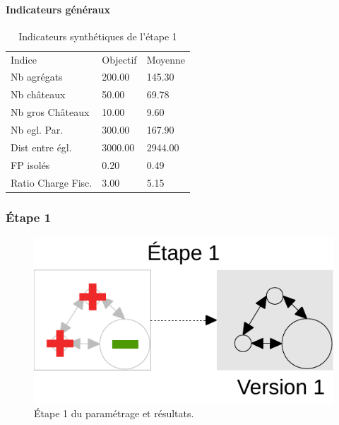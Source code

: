 \documentclass[12pt, a4paper, oneside]{book}
\begin{document}
	\paragraph{Indicateurs généraux}
	
	\begin{table}[H]
		\centering
		\caption{Indicateurs synthétiques de l'étape 1}
		\label{my-label}
		\begin{tabular}{lll}
			Indice             & Objectif & Moyenne \\
			Nb agrégats        & 200.00   & 145.30  \\
			Nb châteaux        & 50.00    & 69.78   \\
			Nb gros  Châteaux  & 10.00    & 9.60    \\
			Nb egl. Par.       & 300.00   & 167.90  \\
			Dist entre égl.    & 3000.00  & 2944.00 \\
			FP isolés          & 0.20     & 0.49    \\
			Ratio Charge Fisc. & 3.00     & 5.15   
		\end{tabular}
	\end{table}

\pagebreak
	\subsubsection{Étape 1}
		\begin{figure}[H]
			\centering
			\includegraphics[width = \linewidth, page = 1]{img/schemas_etapes_individuelles.pdf}
			\caption{Étape 1 du paramétrage et résultats.}
		\end{figure}

\pagebreak
\end{document}
